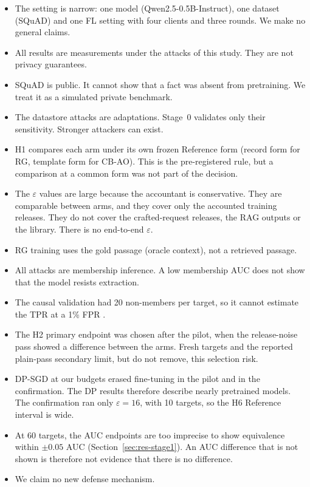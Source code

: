 \documentclass[11pt]{article}
\begin{document}
\begin{itemize}
  \item The setting is narrow: one model (Qwen2.5-0.5B-Instruct), one dataset (SQuAD) and one FL setting with four clients and three rounds. We make no general claims.
  \item All results are measurements under the attacks of this study. They are not privacy guarantees.
  \item SQuAD is public. It cannot show that a fact was absent from pretraining. We treat it as a simulated private benchmark.
  \item The datastore attacks are adaptations. Stage~0 validates only their sensitivity. Stronger attackers can exist.
  \item H1 compares each arm under its own frozen Reference form (record form for RG, template form for CB-AO). This is the pre-registered rule, but a comparison at a common form was not part of the decision.
  \item The $\varepsilon$ values are large because the accountant is conservative. They are comparable between arms, and they cover only the accounted training releases. They do not cover the crafted-request releases, the RAG outputs or the library. There is no end-to-end $\varepsilon$.
  \item RG training uses the gold passage (oracle context), not a retrieved passage.
  \item All attacks are membership inference. A low membership AUC does not show that the model resists extraction.
  \item The causal validation had 20 non-members per target, so it cannot estimate the TPR at a 1\% FPR \citep{carlini2022first}.
  \item The H2 primary endpoint was chosen after the pilot, when the release-noise pass showed a difference between the arms. Fresh targets and the reported plain-pass secondary limit, but do not remove, this selection risk.
  \item DP-SGD at our budgets erased fine-tuning in the pilot and in the confirmation. The DP results therefore describe nearly pretrained models. The confirmation ran only $\varepsilon=16$, with 10 targets, so the H6 Reference interval is wide.
  \item At 60 targets, the AUC endpoints are too imprecise to show equivalence within $\pm0.05$ AUC (Section~\ref{sec:res-stage1}). An AUC difference that is not shown is therefore not evidence that there is no difference.
  \item We claim no new defense mechanism.
\end{itemize}
\end{document}
